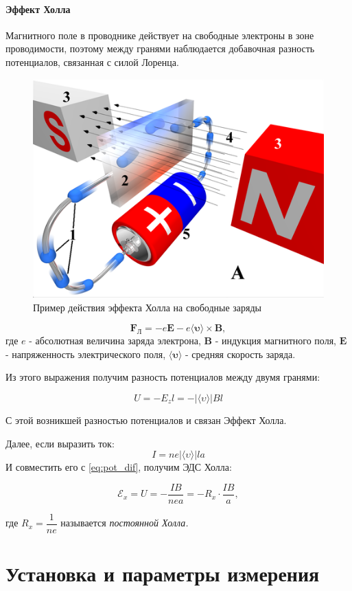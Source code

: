 \documentclass{physlab}
\begin{document}
\paragraph{Эффект Холла} 
Магнитного поле в проводнике действует на свободные электроны в зоне проводимости, поэтому между гранями наблюдается добавочная разность потенциалов, связанная с силой Лоренца.

\begin {figure}[H]
	\begin{center}
		\includegraphics[width = 0.35 \textwidth]{hall_effect}
		\caption{Пример действия эффекта Холла на свободные заряды}
	\end{center}
\end {figure}



$$\boldsymbol{F_\text{Л}}  = -e \boldsymbol{E} - e \langle \boldsymbol{\upsilon} \rangle \times \boldsymbol{B},$$
где $e$ - абсолютная величина заряда электрона, $\boldsymbol{B}$ - индукция магнитного поля, $\boldsymbol{E}$ - напряженность электрического поля, $ \langle \boldsymbol{\upsilon} \rangle$ - средняя скорость заряда.

Из этого выражения получим разность потенциалов между двумя гранями:

\begin{equation}
U = -E_zl = - | \langle \upsilon \rangle | B l
\label{eq:pot_dif}
\end{equation}

С этой возникшей разностью потенциалов и связан Эффект Холла.

Далее, если выразить ток:
$$ I = ne |\langle \upsilon \rangle |  l a$$
И совместить его с \eqref{eq:pot_dif}, получим ЭДС Холла:

\begin{equation}
\mathscr{E}_x = U = - \dfrac{IB}{nea} = -R_x \cdot \dfrac{IB}{a},
\label{eq:hall}
\end{equation}

где $R_x = \dfrac{1}{ne}$ называется \textit{постоянной Холла.}

\section{Установка и параметры измерения}
\end{document}

